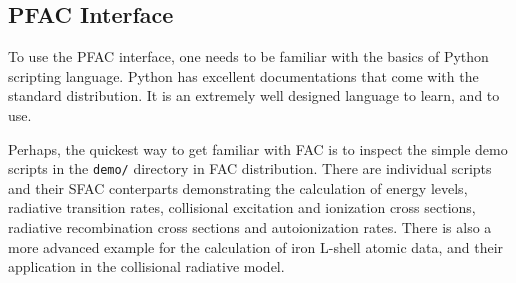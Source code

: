 \documentclass[twoside,letterpaper]{refrep}
\begin{document}
\subsection{PFAC Interface}
To use the PFAC interface, one needs to be familiar with the basics of Python
scripting language. Python has excellent documentations that come with the standard
distribution. It is an extremely well designed language to learn, and to use.

Perhaps, the quickest way to get familiar with FAC is to inspect the simple
demo scripts in the \verb|demo/| directory in FAC distribution. There
are individual scripts and their SFAC conterparts demonstrating the
calculation of energy levels, radiative transition rates, collisional
excitation and ionization cross sections, radiative recombination cross
sections and autoionization rates. There is also a more advanced example for
the calculation of iron L-shell atomic data, and their application in the
collisional radiative model.
\end{document}
